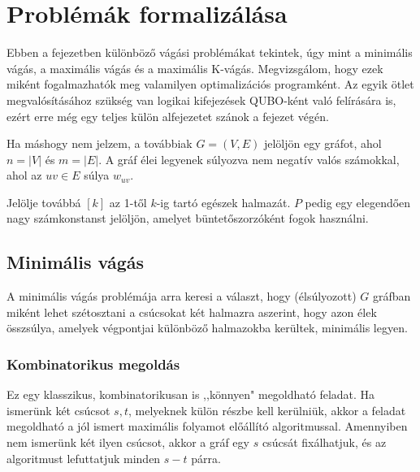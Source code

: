 
\chapter{Problémák formalizálása}\label{chap:cuts}


Ebben a fejezetben különböző vágási problémákat tekintek, úgy mint a minimális vágás, a maximális vágás és a maximális K-vágás. Megvizsgálom, hogy ezek miként fogalmazhatók meg valamilyen optimalizációs programként. Az egyik ötlet megvalósításához szükség van logikai kifejezések QUBO-ként való felírására is, ezért erre még egy teljes külön alfejezetet szánok a fejezet végén.

Ha máshogy nem jelzem, a továbbiak $G=(V,E)$ jelöljön egy gráfot, ahol $n=|V|$ és $m=|E|$. A gráf élei legyenek súlyozva nem negatív valós számokkal, ahol az $uv \in E$ súlya $w_{uv}$.

Jelölje továbbá $[k]$ az 1-től $k$-ig tartó egészek halmazát. $P$ pedig egy elegendően nagy számkonstanst jelöljön, amelyet büntetőszorzóként fogok használni.


\section{Minimális vágás}\label{sec:theoryMinCut}

A minimális vágás problémája arra keresi a választ, hogy (élsúlyozott) $G$ gráfban miként lehet szétosztani a csúcsokat két halmazra aszerint, hogy azon élek összsúlya, amelyek végpontjai különböző halmazokba kerültek, minimális legyen.

\subsection{Kombinatorikus megoldás}

Ez egy klasszikus, kombinatorikusan is ,,könnyen" megoldható feladat. Ha ismerünk két csúcsot $s, t$, melyeknek külön részbe kell kerülniük, akkor a feladat megoldható a jól ismert maximális folyamot előállító algoritmussal. Amennyiben nem ismerünk két ilyen csúcsot, akkor a gráf egy $s$ csúcsát fixálhatjuk, és az algoritmust lefuttatjuk minden $s-t$ párra.

